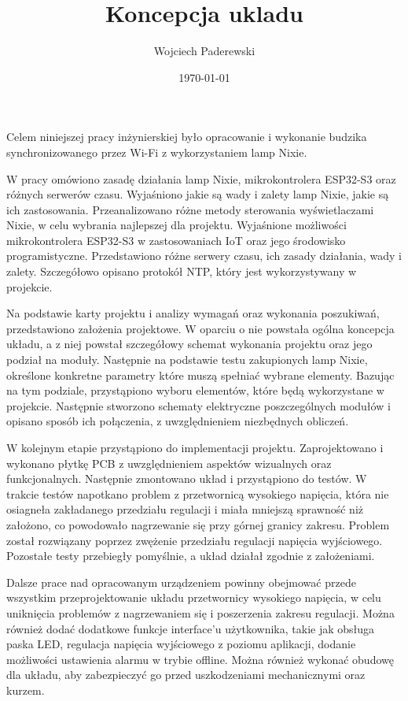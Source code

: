 \documentclass[../main.tex]{subfiles}
\author{Wojciech Paderewski}
\date{\today}
\title{Koncepcja ukladu}
\begin{document}
Celem niniejszej pracy inżynierskiej było opracowanie i wykonanie budzika synchronizowanego przez Wi-Fi z wykorzystaniem lamp Nixie.

W pracy omówiono zasadę działania lamp Nixie, mikrokontrolera ESP32-S3 oraz różnych serwerów czasu.
Wyjaśniono jakie są wady i zalety lamp Nixie, jakie są ich zastosowania. Przeanalizowano różne metody sterowania wyświetlaczami Nixie, w celu wybrania najlepszej dla projektu.
Wyjaśnione możliwości mikrokontrolera ESP32-S3 w zastosowaniach IoT oraz jego środowisko programistyczne.
Przedstawiono różne serwery czasu, ich zasady działania, wady i zalety. Szczegółowo opisano protokół NTP, który jest wykorzystywany w projekcie.

Na podstawie karty projektu i analizy wymagań oraz wykonania poszukiwań, przedstawiono założenia projektowe. W oparciu o nie powstała ogólna koncepcja układu,
a z niej powstał szczegółowy schemat wykonania projektu oraz jego podział na moduły. Następnie na podstawie testu zakupionych lamp Nixie, określone konkretne parametry które muszą spełniać wybrane elementy.
Bazując na tym podziale, przystąpiono wyboru elementów, które będą wykorzystane w projekcie. Następnie stworzono schematy elektryczne poszczególnych modułów i opisano sposób ich połączenia, z uwzględnieniem niezbędnych obliczeń.

W kolejnym etapie przystąpiono do implementacji projektu. Zaprojektowano i wykonano płytkę PCB z uwzględnieniem aspektów wizualnych oraz funkcjonalnych. Następnie zmontowano układ i przystąpiono do testów.
W trakcie testów napotkano problem z przetwornicą wysokiego napięcia, która nie osiagneła zakładanego przedziału regulacji i miała mniejszą sprawność niż założono, co powodowało nagrzewanie się przy górnej granicy zakresu. Problem został rozwiązany poprzez zwężenie przedziału regulacji napięcia wyjściowego.
Pozostałe testy przebiegły pomyślnie, a układ działał zgodnie z założeniami.

Dalsze prace nad opracowanym urządzeniem powinny obejmować przede wszystkim przeprojektowanie układu przetwornicy wysokiego napięcia, w celu uniknięcia problemów z nagrzewaniem się i poszerzenia zakresu regulacji. Można również dodać dodatkowe funkcje interface'u użytkownika, 
takie jak obsługa paska LED, regulacja napięcia wyjściowego z poziomu aplikacji, dodanie możliwości ustawienia alarmu w trybie offline. Można również wykonać obudowę dla układu,
aby zabezpieczyć go przed uszkodzeniami mechanicznymi oraz kurzem.
\end{document}
